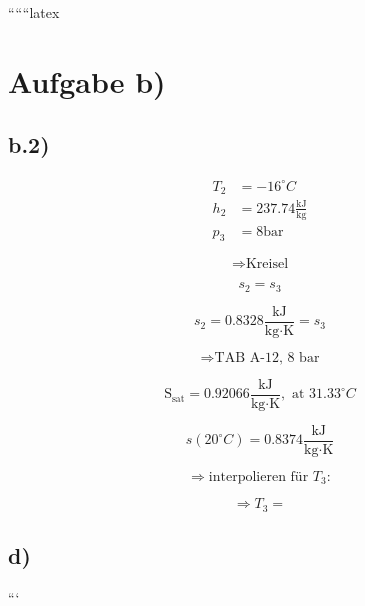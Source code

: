 ``````latex


\section*{Aufgabe b)}

\subsection*{b.2)}
\begin{align*}
    T_2 &= -16^\circ C \\
    h_2 &= 237.74 \frac{\text{kJ}}{\text{kg}} \\
    p_3 &= 8 \text{bar}
\end{align*}

\[
\Rightarrow \text{Kreisel}
\]

\[
s_2 = s_3
\]

\[
s_2 = 0.8328 \frac{\text{kJ}}{\text{kg} \cdot \text{K}} = s_3
\]

\[
\Rightarrow \text{TAB A-12, 8 bar}
\]

\[
\text{S}_{\text{sat}} = 0.92066 \frac{\text{kJ}}{\text{kg} \cdot \text{K}}, \text{ at } 31.33^\circ C
\]

\[
s(20^\circ C) = 0.8374 \frac{\text{kJ}}{\text{kg} \cdot \text{K}}
\]

\[
\Rightarrow \text{interpolieren für } T_3:
\]

\[
\Rightarrow T_3 =
\]

\subsection*{d)}

```